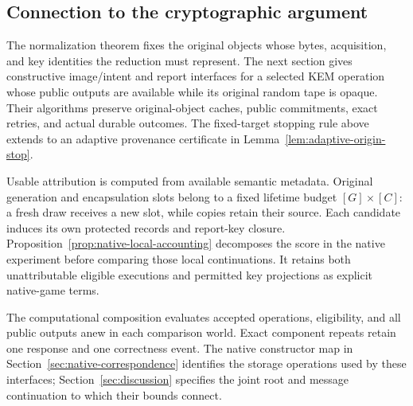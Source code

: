 \subsection{Connection to the cryptographic argument}

The normalization theorem fixes the original objects whose bytes, acquisition,
and key identities the reduction must represent. The next section gives
constructive image/intent and report interfaces for a selected KEM operation
whose public outputs are available while its original random tape is opaque.
Their algorithms preserve original-object caches, public commitments, exact
retries, and actual durable outcomes. The fixed-target stopping rule above
extends to an adaptive provenance certificate in
Lemma~\ref{lem:adaptive-origin-stop}.

Usable attribution is computed from available semantic metadata. Original
generation and encapsulation slots belong to a fixed lifetime budget
$[G]\times[C]$: a fresh draw receives a new slot, while copies retain their
source. Each candidate induces its own protected records and report-key
closure. Proposition~\ref{prop:native-local-accounting} decomposes the score
in the native experiment before comparing those local continuations. It
retains both unattributable eligible executions and permitted key projections
as explicit native-game terms.

The computational composition evaluates accepted operations, eligibility, and
all public outputs anew in each comparison world. Exact component repeats
retain one response and one correctness event. The native constructor map in
Section~\ref{sec:native-correspondence} identifies the storage operations used
by these interfaces; Section~\ref{sec:discussion} specifies the joint root and
message continuation to which their bounds connect.
